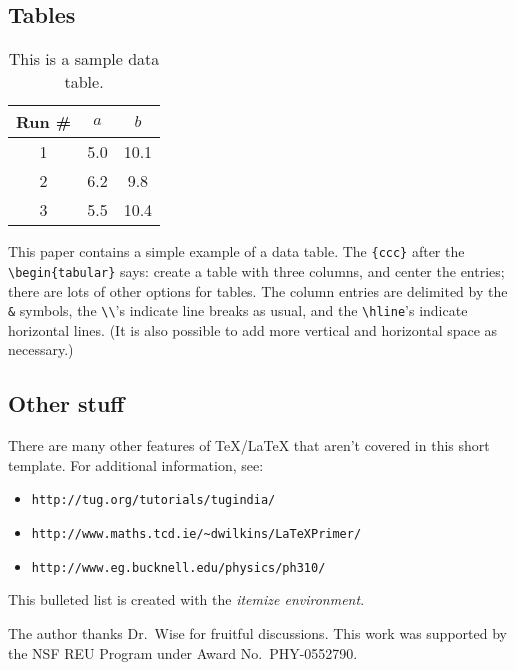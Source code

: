 \documentclass[aps,preprint,groupedaddress,letterpaper]{revtex4-1}
\begin{document}
\subsection{Tables}

\begin{table}
\caption{This is a sample data table.}
\begin{tabular}{ccc}\hline\hline
Run \# &\hspace{0.2in}$a$\hspace{0.2in} & \hspace{0.2in}$b$\hspace{0.2in}\mbox{}\\
\hline
1      & 5.0 &  10.1 \\ 
2      & 6.2 &  9.8  \\ 
3      & 5.5 &  10.4 \\ 
\hline\hline 
\end{tabular}
\end{table}

This paper contains a simple example of a data table. The \verb+{ccc}+ after
the \verb+\begin{tabular}+ says: create a table with three columns, 
and center the entries;  there are lots of other  options for tables. 
The column entries are delimited by the \verb+&+ symbols, the 
\verb+\\+'s indicate line breaks as usual, and the \verb+\hline+'s
indicate horizontal lines.  (It is also possible to add more vertical
and horizontal space as necessary.) 

\subsection{Other stuff}
There are many other features of TeX/LaTeX that aren't covered
in this short template.   For additional information, see:
\begin{itemize}
\item \verb+http://tug.org/tutorials/tugindia/+
\item \verb+http://www.maths.tcd.ie/~dwilkins/LaTeXPrimer/+
\item \verb+http://www.eg.bucknell.edu/physics/ph310/+
\end{itemize}
This bulleted list is created with the \textit{itemize environment}.
 
\begin{acknowledgments}
The author thanks Dr.~Wise for fruitful discussions.  This work 
was supported by the NSF REU Program under Award No.\ PHY-0552790. 
\end{acknowledgments}



\end{document}
